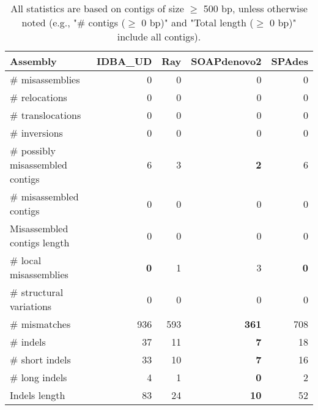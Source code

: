 \documentclass[12pt,a4paper]{article}
\begin{document}
\begin{table}[ht]
\begin{center}
\caption{All statistics are based on contigs of size $\geq$ 500 bp, unless otherwise noted (e.g., "\# contigs ($\geq$ 0 bp)" and "Total length ($\geq$ 0 bp)" include all contigs).}
\begin{tabular}{|l*{4}{|r}|}
\hline
Assembly & IDBA\_UD & Ray & SOAPdenovo2 & SPAdes \\ \hline
\# misassemblies & 0 & 0 & 0 & 0 \\ \hline
\hspace{5mm}\# relocations & 0 & 0 & 0 & 0 \\ \hline
\hspace{5mm}\# translocations & 0 & 0 & 0 & 0 \\ \hline
\hspace{5mm}\# inversions & 0 & 0 & 0 & 0 \\ \hline
\# possibly misassembled contigs & 6 & 3 & {\bf 2} & 6 \\ \hline
\# misassembled contigs & 0 & 0 & 0 & 0 \\ \hline
Misassembled contigs length & 0 & 0 & 0 & 0 \\ \hline
\# local misassemblies & {\bf 0} & 1 & 3 & {\bf 0} \\ \hline
\# structural variations & 0 & 0 & 0 & 0 \\ \hline
\# mismatches & 936 & 593 & {\bf 361} & 708 \\ \hline
\# indels & 37 & 11 & {\bf 7} & 18 \\ \hline
\hspace{5mm}\# short indels & 33 & 10 & {\bf 7} & 16 \\ \hline
\hspace{5mm}\# long indels & 4 & 1 & {\bf 0} & 2 \\ \hline
Indels length & 83 & 24 & {\bf 10} & 52 \\ \hline
\end{tabular}
\end{center}
\end{table}
\end{document}
